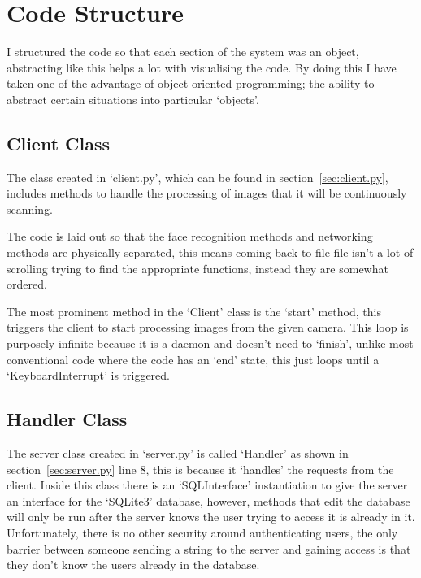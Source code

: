 \documentclass[12pt,a4paper]{report}
\begin{document}
\section{Code Structure}
I structured the code so that each section of the system was an object, abstracting like this helps a lot with
visualising the code. By doing this I have taken one of the advantage of object-oriented programming; the ability
to abstract certain situations into particular `objects'.

    \subsection{Client Class}
    \label{sec:clientstructure}
    The class created in `client.py', which can be found in section~\ref{sec:client.py}, includes methods to handle
    the processing of images that it will be continuously scanning. 

    The code is laid out so that the face recognition methods and networking methods are physically separated, this means
    coming back to file file isn't a lot of scrolling trying to find the appropriate functions, instead they are somewhat
    ordered.

    The most prominent method in the `Client' class is the `start' method, this triggers the client to start processing
    images from the given camera. This loop is purposely infinite because it is a daemon and doesn't need to `finish', unlike
    most conventional code where the code has an `end' state, this just loops until a `KeyboardInterrupt' is triggered.

    

    \subsection{Handler Class}
    The server class created in `server.py' is called `Handler' as shown in section~\ref{sec:server.py} line 8, this is 
    because it `handles' the requests from the client. Inside this class there is an `SQLInterface' instantiation to give 
    the server an interface for the `SQLite3' database, however, methods that edit the database will only be run after the 
    server knows the user trying to access it is already in it. Unfortunately, there is no other security around authenticating 
    users, the only barrier between someone sending a string to the server and gaining access is that they don't know the users 
    already in the database.
\end{document}
